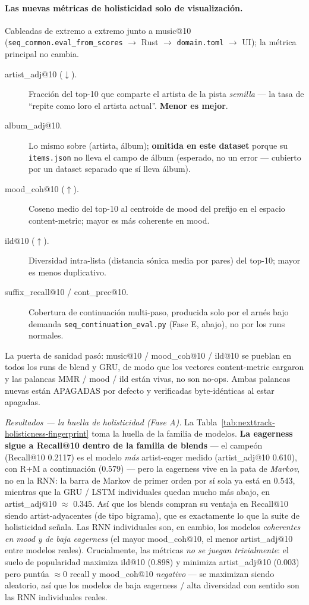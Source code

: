 \documentclass[11pt]{article}
\begin{document}
\paragraph{Las nuevas métricas de holisticidad solo de visualización.} Cableadas de
extremo a extremo junto a music@10 (\texttt{seq\_common.eval\_from\_scores} $\to$ Rust
$\to$ \texttt{domain.toml} $\to$ UI); la métrica principal no cambia.
\begin{description}
  \item[artist\_adj@10 ($\downarrow$).] Fracción del top-10 que comparte el artista de
  la pista \emph{semilla} --- la tasa de ``repite como loro el artista actual''.
  \textbf{Menor es mejor}.
  \item[album\_adj@10.] Lo mismo sobre (artista, álbum); \textbf{omitida en este
  dataset} porque su \texttt{items.json} no lleva el campo de álbum (esperado, no un
  error --- cubierto por un dataset separado que sí lleva álbum).
  \item[mood\_coh@10 ($\uparrow$).] Coseno medio del top-10 al centroide de mood del
  prefijo en el espacio content-metric; mayor es más coherente en mood.
  \item[ild@10 ($\uparrow$).] Diversidad intra-lista (distancia sónica media por pares)
  del top-10; mayor es menos duplicativo.
  \item[suffix\_recall@10 / cont\_prec@10.] Cobertura de continuación multi-paso,
  producida solo por el arnés bajo demanda \texttt{seq\_continuation\_eval.py}
  (Fase E, abajo), no por los runs normales.
\end{description}
La puerta de sanidad pasó: music@10 / mood\_coh@10 / ild@10 se pueblan en todos los
runs de blend y GRU, de modo que los vectores content-metric cargaron y las palancas
MMR / mood / ild están vivas, no son no-ops. Ambas palancas nuevas están APAGADAS por
defecto y verificadas byte-idénticas al estar apagadas.

\emph{Resultados --- la huella de holisticidad (Fase A).} La Tabla~\ref{tab:nexttrack-holisticness-fingerprint}
toma la huella de la familia de modelos. \textbf{La eagerness sigue a Recall@10 dentro
de la familia de blends} --- el campeón (Recall@10 \num{0.2117}) es el modelo \emph{más}
artist-eager medido (artist\_adj@10 \num{0.610}), con R+M a continuación (\num{0.579})
--- pero la eagerness vive en la pata de \emph{Markov}, no en la RNN: la barra de Markov
de primer orden por sí sola ya está en \num{0.543}, mientras que la GRU / LSTM
individuales quedan mucho más abajo, en artist\_adj@10 $\approx$ \num{0.345}. Así que
los blends compran su ventaja en Recall@10 siendo artist-adyacentes (de tipo bigrama),
que es exactamente lo que la suite de holisticidad señala. Las RNN individuales son, en
cambio, los modelos \emph{coherentes en mood y de baja eagerness} (el mayor
mood\_coh@10, el menor artist\_adj@10 entre modelos reales). Crucialmente, las métricas
\emph{no se juegan trivialmente}: el suelo de popularidad maximiza ild@10 (\num{0.898})
y minimiza artist\_adj@10 (\num{0.003}) pero puntúa $\approx 0$ recall y mood\_coh@10
\emph{negativo} --- se maximizan siendo aleatorio, así que los modelos de baja eagerness
/ alta diversidad con sentido son las RNN individuales reales.
\end{document}
